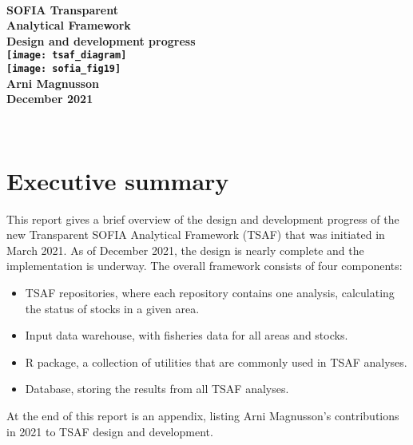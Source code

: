 \documentclass[12pt]{article}
\begin{document}
\thispagestyle{empty}

\begin{center}
  ~\\[0ex]
  \Large\bfseries SOFIA Transparent\\
  Analytical Framework\\[1.5ex]
  \large{\rm Design and development progress}\\[2.6cm]
  \texttt{[image: tsaf\_diagram]}\\[1.5cm]
  \hspace{-1.5ex}\texttt{[image: sofia\_fig19]}\\[1.8cm]
  \mdseries Arni Magnusson\\[1.6ex]
  December 2021
\end{center}

\newpage

~\vspace{1em}
\setcounter{tocdepth}{2}
\tableofcontents

\newpage

\section{Executive summary}

This report gives a brief overview of the design and development progress of the
new Transparent SOFIA Analytical Framework (TSAF) that was initiated in March
2021. As of December 2021, the design is nearly complete and the implementation
is underway. The overall framework consists of four components:\\[-3ex]

\begin{itemize}
  \item TSAF repositories, where each repository contains one analysis,
  calculating the status of stocks in a given area.\\[-3.5ex]
  \item Input data warehouse, with fisheries data for all areas and
  stocks.\\[-3.5ex]
  \item R package, a collection of utilities that are commonly used in TSAF
  analyses.\\[-3.5ex]
  \item Database, storing the results from all TSAF analyses.\\[-3ex]
\end{itemize}

At the end of this report is an appendix, listing Arni Magnusson's contributions
in 2021 to TSAF design and development.
\end{document}
